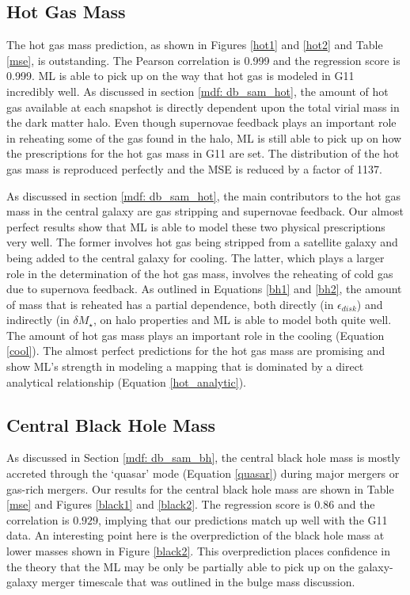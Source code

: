 \documentclass[a4paper,fleqn,usenatbib]{mnras}
\begin{document}
\subsection{Hot Gas Mass} \label{results_hot}
The hot gas mass prediction, as shown in Figures \ref{hot1} and \ref{hot2} and Table \ref{mse}, is outstanding. The Pearson correlation is 0.999 and the regression score is 0.999. ML is able to pick up on the way that hot gas is modeled in G11 incredibly well. As discussed in section \ref{mdf: db_sam_hot}, the amount of hot gas available at each snapshot is directly dependent upon the total virial mass in the dark matter halo. Even though supernovae feedback plays an important role in reheating some of the gas found in the halo, ML is still able to pick up on how the prescriptions for the hot gas mass in G11 are set. The distribution of the hot gas mass is reproduced perfectly and the MSE is reduced by a factor of 1137. 

\par 
As discussed in section \ref{mdf: db_sam_hot}, the main contributors to the hot gas mass in the central galaxy are gas stripping and supernovae feedback. Our almost perfect results show that ML is able to model these two physical prescriptions very well. The former involves hot gas being stripped from a satellite galaxy and being added to the central galaxy for cooling. The latter, which plays a larger role in the determination of the hot gas mass, involves the reheating of cold gas due to supernova feedback. As outlined in Equations \ref{bh1} and \ref{bh2}, the amount of mass that is reheated has a partial dependence, both directly (in $\epsilon_{disk}$) and indirectly (in $\delta M_{\star}$, on halo properties and ML is able to model both quite well. The amount of hot gas mass plays an important role in the cooling (Equation \ref{cool}). The almost perfect predictions for the hot gas mass are promising and show ML's strength in modeling a mapping that is dominated by a direct analytical relationship (Equation \ref{hot_analytic}). 

\subsection{Central Black Hole Mass} \label{results_bh}
As discussed in Section \ref{mdf: db_sam_bh}, the central black hole mass is mostly accreted through the `quasar' mode (Equation \ref{quasar}) during major mergers or gas-rich mergers. Our results for the central black hole mass are shown in Table \ref{mse} and Figures \ref{black1} and \ref{black2}. The regression score is $0.86$ and the correlation is $0.929$, implying that our predictions match up well with the G11 data. An interesting point here is the overprediction of the black hole mass at lower masses shown in Figure \ref{black2}. This overprediction places confidence in the theory that the ML may be only be partially able to pick up on the galaxy-galaxy merger timescale that was outlined in the bulge mass discussion. 
\end{document}
